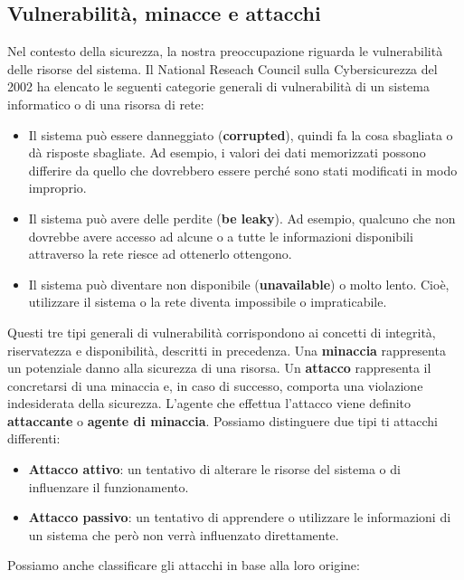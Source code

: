 \subsection{Vulnerabilità, minacce e attacchi}
Nel contesto della sicurezza, la nostra preoccupazione riguarda le vulnerabilità
delle risorse del sistema. Il National Reseach Council sulla Cybersicurezza del 2002
ha elencato le seguenti categorie generali di
vulnerabilità di un sistema informatico o di una risorsa di rete:

\begin{itemize}
      \item Il sistema può essere danneggiato (\textbf{corrupted}), quindi fa la cosa sbagliata o dà risposte sbagliate. Ad esempio, i valori dei dati memorizzati possono differire da quello che dovrebbero essere perché sono stati modificati in modo improprio.
      \item Il sistema può avere delle perdite (\textbf{be leaky}). Ad esempio,
            qualcuno che non dovrebbe avere accesso ad alcune o a tutte le informazioni
            disponibili attraverso la rete riesce ad ottenerlo ottengono.
      \item Il sistema può diventare non disponibile (\textbf{unavailable}) o molto
            lento. Cioè, utilizzare il sistema o la rete diventa impossibile o impraticabile.
\end{itemize}

Questi tre tipi generali di vulnerabilità corrispondono ai concetti di integrità,
riservatezza e disponibilità, descritti in precedenza.
Una \textbf{minaccia} rappresenta un potenziale danno alla sicurezza di una risorsa.
Un \textbf{attacco} rappresenta il concretarsi di  una minaccia e, in caso di
successo, comporta una violazione indesiderata della sicurezza.
L'agente che effettua l'attacco viene definito \textbf{attaccante} o
\textbf{agente di minaccia}. Possiamo distinguere due tipi ti attacchi differenti:

\begin{itemize}
      \item \textbf{Attacco attivo}: un tentativo di alterare le risorse del
            sistema o di influenzare il funzionamento.
      \item \textbf{Attacco passivo}: un tentativo di apprendere o
            utilizzare le informazioni di un sistema che però non verrà influenzato
            direttamente.
\end{itemize}

Possiamo anche classificare gli attacchi in base alla loro origine:

